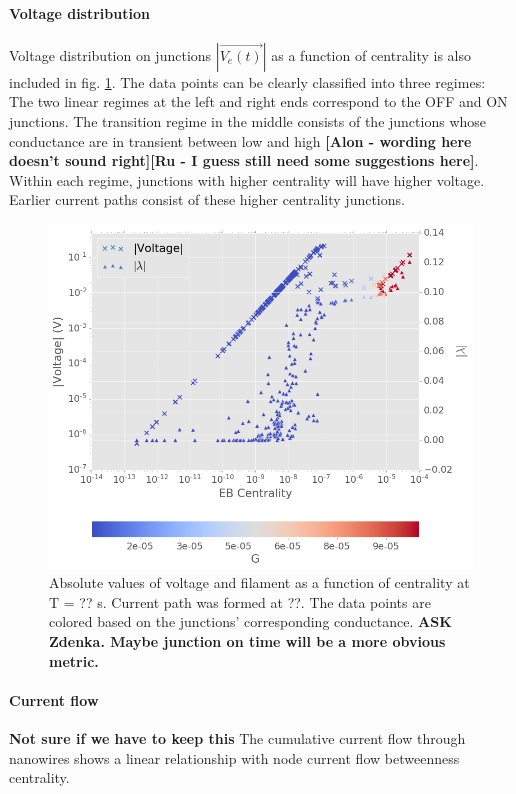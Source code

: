 \documentclass[%
 reprint,
 amsmath,amssymb,
 aps,
floatfix,
]{revtex4-2}
\begin{document}
\paragraph{Voltage distribution} 

Voltage distribution on junctions $|\vec{V_e(t)}|$ as a function of centrality is also included in fig. \ref{fig:v_lam_cent}. The data points can be clearly classified into three regimes: The two linear regimes at the left and right ends correspond to the OFF and ON junctions. The transition regime in the middle consists of the junctions whose conductance are in transient between low and high \textbf{[Alon -  wording here doesn't sound right][Ru - I guess still need some suggestions here]}. Within each regime, junctions with higher centrality will have higher voltage. Earlier current paths consist of these higher centrality junctions.

\begin{figure}[h]
	\centering
	\includegraphics[width=1\linewidth]{figure/v_lam_cent}
	\caption{Absolute values of voltage and filament as a function of centrality at T = ?? s. Current path was formed at ??. The data points are colored based on the junctions' corresponding conductance. \textbf{ASK Zdenka. Maybe junction on time will be a more obvious metric.}}
	\label{fig:v_lam_cent}
\end{figure}

\paragraph{Current flow}
\textbf{Not sure if we have  to keep this}
The cumulative current flow through nanowires shows a linear relationship with node current flow betweenness centrality. 
\end{document}

